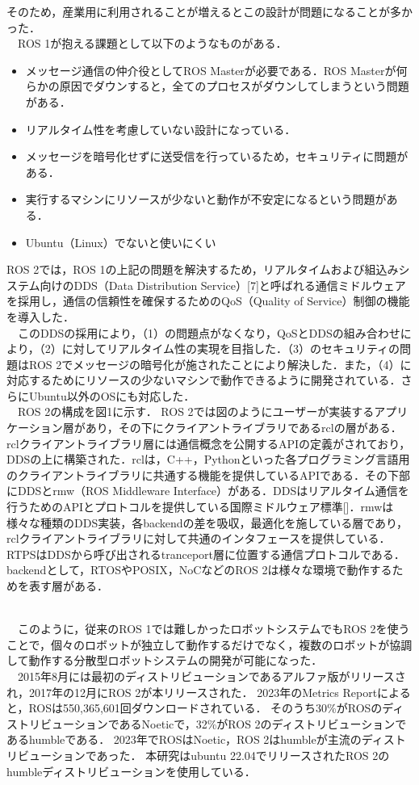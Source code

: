 そのため，産業用に利用されることが増えるとこの設計が問題になることが多かった．
\\　ROS 1が抱える課題として以下のようなものがある．
   \begin{itemize}
       \item メッセージ通信の仲介役としてROS Masterが必要である．ROS Masterが何らかの原因でダウンすると，全てのプロセスがダウンしてしまうという問題がある．
       \item リアルタイム性を考慮していない設計になっている．
       \item メッセージを暗号化せずに送受信を行っているため，セキュリティに問題がある．
       \item 実行するマシンにリソースが少ないと動作が不安定になるという問題がある．
       \item Ubuntu（Linux）でないと使いにくい
   \end{itemize}
ROS 2では，ROS 1の上記の問題を解決するため，リアルタイムおよび組込みシステム向けのDDS（Data Distribution Service）[7]と呼ばれる通信ミドルウェアを採用し，通信の信頼性を確保するためのQoS（Quality of Service）制御の機能を導入した．\\
　このDDSの採用により，（1）の問題点がなくなり，QoSとDDSの組み合わせにより，（2）に対してリアルタイム性の実現を目指した．（3）のセキュリティの問題はROS 2でメッセージの暗号化が施されたことにより解決した．また，（4）に対応するためにリソースの少ないマシンで動作できるように開発されている．さらにUbuntu以外のOSにも対応した．
\\　ROS 2の構成を図1に示す．
ROS 2では図のようにユーザーが実装するアプリケーション層があり，その下にクライアントライブラリであるrclの層がある．rclクライアントライブラリ層には通信概念を公開するAPIの定義がされており，DDSの上に構築された．rclは，C++，Pythonといった各プログラミング言語用のクライアントライブラリに共通する機能を提供しているAPIである．その下部にDDSとrmw（ROS Middleware Interface）がある．DDSはリアルタイム通信を行うためのAPIとプロトコルを提供している国際ミドルウェア標準[]．rmwは様々な種類のDDS実装，各backendの差を吸収，最適化を施している層であり，rclクライアントライブラリに対して共通のインタフェースを提供している．RTPSはDDSから呼び出されるtranceport層に位置する通信プロトコルである．backendとして，RTOSやPOSIX，NoCなどのROS 2は様々な環境で動作するためを表す層がある．

\\　このように，従来のROS 1では難しかったロボットシステムでもROS 2を使うことで，個々のロボットが独立して動作するだけでなく，複数のロボットが協調して動作する分散型ロボットシステムの開発が可能になった．
\\　2015年8月には最初のディストリビューションであるアルファ版がリリースされ，2017年の12月にROS 2が本リリースされた．
2023年のMetrics Reportによると，ROSは550,365,601回ダウンロードされている．
そのうち30\%がROSのディストリビューションであるNoeticで，32\%がROS 2のディストリビューションであるhumbleである．
2023年でROSはNoetic，ROS 2はhumbleが主流のディストリビューションであった．
本研究はubuntu 22.04でリリースされたROS 2のhumbleディストリビューションを使用している．
